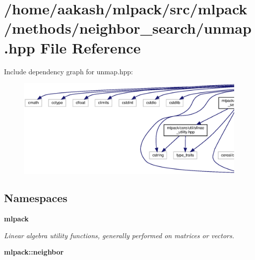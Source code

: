 \section{/home/aakash/mlpack/src/mlpack/methods/neighbor\+\_\+search/unmap.hpp File Reference}
\label{unmap_8hpp}
Include dependency graph for unmap.\+hpp\+:
\nopagebreak
\begin{figure}[H]
\begin{center}
\leavevmode
\includegraphics[width=350pt]{unmap_8hpp__incl}
\end{center}
\end{figure}
\subsection*{Namespaces}
\begin{DoxyCompactItemize}
\item 
 \textbf{ mlpack}
\begin{DoxyCompactList}\small\item\em Linear algebra utility functions, generally performed on matrices or vectors. \end{DoxyCompactList}\item 
 \textbf{ mlpack\+::neighbor}
\end{DoxyCompactItemize}
